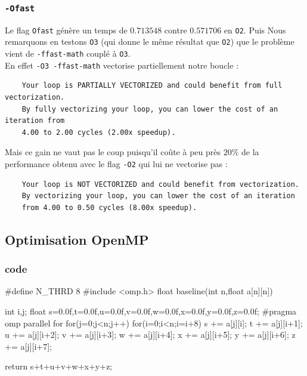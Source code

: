 \documentclass{report}
\begin{document}
  \subsubsection{\texttt{-Ofast}}
  Le flag \texttt{Ofast} génère un temps de $0.713548$ contre $0.571706$ en \texttt{O2}. Puis Nous remarquons
  en testons \texttt{O3} (qui donne le même résultat que \texttt{O2}) que le problème vient de \texttt{-ffast-math}
  couplé à \texttt{O3}. \\
  En effet \texttt{-O3 -ffast-math} vectorise partiellement notre boucle :
  \begin{verbatim}
    Your loop is PARTIALLY VECTORIZED and could benefit from full vectorization.
    By fully vectorizing your loop, you can lower the cost of an iteration from
    4.00 to 2.00 cycles (2.00x speedup).
  \end{verbatim}
  Mais ce gain ne vaut pas le coup puisqu'il coûte à peu près $20\%$ de
  la performance obtenu avec le flag \texttt{-O2} qui lui ne vectorise pas :
  \begin{verbatim}
    Your loop is NOT VECTORIZED and could benefit from vectorization.
    By vectorizing your loop, you can lower the cost of an iteration
    from 4.00 to 0.50 cycles (8.00x speedup).
  \end{verbatim}
  \subsection{Optimisation OpenMP}
  \subsubsection{code}
  \begin{cc}
    #define N_THRD 8
    #include <omp.h>
    float baseline(int n,float a[n][n])
    {
        int i,j;
        float s=0.0f,t=0.0f,u=0.0f,v=0.0f,w=0.0f,x=0.0f,y=0.0f,z=0.0f;
        #pragma omp parallel for
        for(j=0;j<n;j++)
          for(i=0;i<n;i=i+8)
          {
                s += a[j][i];
                t += a[j][i+1];
                u += a[j][i+2];
                v += a[j][i+3];
                w += a[j][i+4];
                x += a[j][i+5];
                y += a[j][i+6];
                z += a[j][i+7];
          }

        return s+t+u+v+w+x+y+z;
    }
  \end{cc}
\end{document}
